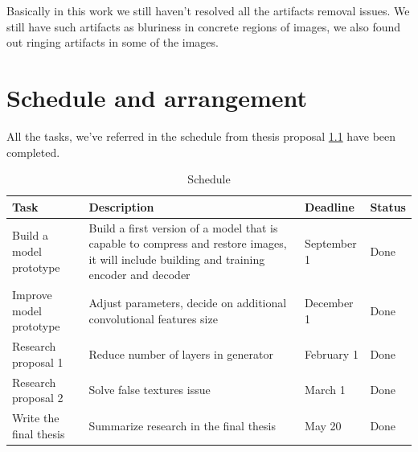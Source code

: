 Basically in this work we still haven't resolved all the artifacts removal issues. We still have such artifacts as bluriness in concrete regions of images, we also found out ringing artifacts in some of the images.

\chapter{Schedule and arrangement}

All the tasks, we've referred in the schedule from thesis proposal \ref{tab:schedule} have been completed.

\begin{table}
    \centering
    \caption{Schedule}
    \label{tab:schedule}
    \begin{tabular}{p{4cm}|p{8cm}|p{2cm}|p{2cm}}
        \hline
        Task                    & Description                                                                                                                                & Deadline    & Status \\
        \hline
        Build a model prototype & Build a first version of a model that is capable to compress and restore images, it will include building and training encoder and decoder & September 1 & Done   \\
        \hline
        Improve model prototype & Adjust parameters, decide on additional convolutional features size                                                                        & December 1  & Done   \\
        \hline
        Research proposal 1     & Reduce number of layers in generator                                                                                                       & February 1  & Done   \\
        \hline
        Research proposal 2     & Solve false textures issue                                                                                                                 & March 1     & Done   \\
        \hline
        Write the final thesis  & Summarize research in the final thesis                                                                                                     & May 20      & Done   \\
        \hline
    \end{tabular}
\end{table}
